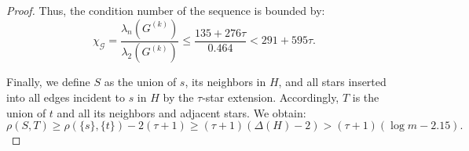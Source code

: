\documentclass[a4paper,USenglish,cleveref, autoref, thm-restate]{lipics-v2021}
\newcommand{\cG}{{\mathcal G}}
\begin{document}
\begin{proof}
Thus, the condition number of the sequence is bounded by:
\begin{equation}
    \chi_\cG = \frac{\lambda_n(G^{(k)})}{\lambda_2(G^{(k)})} \leq \frac{135 + 276\tau}{0.464} < 291 + 595 \tau.
\end{equation}

Finally, we define $S$ as the union of $s$, its neighbors in $H$, and all stars inserted into all edges incident to $s$ in $H$ by the $\tau$-star extension. Accordingly, $T$ is the union of $t$ and all its neighbors and adjacent stars.
We obtain:
\begin{equation}
  \rho(S, T) \geq \rho(\{s\}, \{t\}) - 2 (\tau + 1) \geq (\tau + 1)(\Delta(H) - 2) > (\tau + 1) (\log m - 2.15).
\end{equation}

\end{proof}
\end{document}
